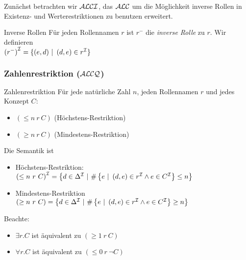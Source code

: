 Zunächst betrachten wir $\mathcal{A}\mathcal{L}\mathcal{C}\mathcal{I}$, das $\mathcal{A}\mathcal{L}\mathcal{C}$ um die Möglichkeit inverse Rollen in Existenz- und Werterestriktionen zu benutzen erweitert.

\begin{definition}{Inverse Rollen}
Für jeden Rollennamen $r$ ist $r^{-}$ die \emph{inverse
Rolle} zu $r$. Wir definieren \\
$\left( r^{-} \right)^{\mathcal{I}} = \left\{ \left( e,d \right)\  \right|\ \left( d,e \right) \in r^{\mathcal{I}}\}$
\end{definition}

\subsubsection{Zahlenrestriktion (\texorpdfstring{$\mathcal{A}\mathcal{L}\mathcal{C}\mathcal{Q}$}{ALCQ})}\label{zahlenrestriktion-alcq}

\begin{definition}{Zahlenrestriktion}
Für jede natürliche Zahl $n$, jeden Rollennamen $r$ und
jedes Konzept $C$:

\begin{itemize}
  \item $\left( \leq n\ r\ C \right)$ (Höchstens-Restriktion)
  \item $\left( \geq n\ r\ C \right)$ (Mindestens-Restriktion)
\end{itemize}

Die Semantik ist
\begin{itemize}
\item
  Höchstens-Restriktion:
  $\left( \leq n\ r\ C \right)^{\MI} = \left\{ d \in \Delta^{\MI}\ |\ \#\left\{ e\ |\ \left( d,e \right) \in r^{\MI} \land e \in C^{\MI} \right\} \leq n \right\}$
\item
  Mindestens-Restriktion
  $( \geq n\ r\ C) = \left\{ d \in \Delta^{\mathcal{I}}\ |\ \#\left\{ e\ |\ \left( d,e \right) \in r^{\mathcal{I}} \land e \in C^{\mathcal{I}} \right\} \geq n \right\}$
\end{itemize}
\end{definition}

Beachte:

\begin{itemize}
  \item $\exists r.C$ ist äquivalent zu $(\geq 1\ r\ C)$
  \item $\forall r.C$ ist äquivalent zu $(\leq 0\ r\ \neg C)$
\end{itemize}
